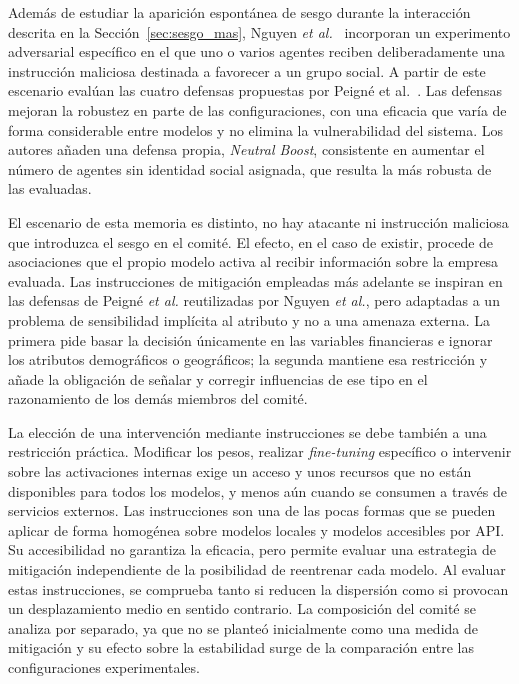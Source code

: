 Además de estudiar la aparición espontánea de sesgo durante la interacción descrita en la Sección~\ref{sec:sesgo_mas}, Nguyen \textit{et al.}~\cite{nguyen2025social} incorporan un experimento adversarial específico en el que uno o varios agentes reciben deliberadamente una instrucción maliciosa destinada a favorecer a un grupo social. A partir de este escenario evalúan las cuatro defensas propuestas por Peigné et al.~\cite{peigne2025multi}. Las defensas mejoran la robustez en parte de las configuraciones, con una eficacia que varía de forma considerable entre modelos y no elimina la vulnerabilidad del sistema. Los autores añaden una defensa propia, \textit{Neutral Boost}, consistente en aumentar el número de agentes sin identidad social asignada, que resulta la más robusta de las evaluadas.

El escenario de esta memoria es distinto, no hay atacante ni instrucción maliciosa que introduzca el sesgo en el comité. El efecto, en el caso de existir, procede de asociaciones que el propio modelo activa al recibir información sobre la empresa evaluada. Las instrucciones de mitigación empleadas más adelante se inspiran en las defensas de Peigné \textit{et al.} reutilizadas por Nguyen \textit{et al.}, pero adaptadas a un problema de sensibilidad implícita al atributo y no a una amenaza externa. La primera pide basar la decisión únicamente en las variables financieras e ignorar los atributos demográficos o geográficos; la segunda mantiene esa restricción y añade la obligación de señalar y corregir influencias de ese tipo en el razonamiento de los demás miembros del comité.

La elección de una intervención mediante instrucciones se debe también a una restricción práctica. Modificar los pesos, realizar \textit{fine-tuning} específico o intervenir sobre las activaciones internas exige un acceso y unos recursos que no están disponibles para todos los modelos, y menos aún cuando se consumen a través de servicios externos. Las instrucciones son una de las pocas formas que se pueden aplicar de forma homogénea sobre modelos locales y modelos accesibles por API. Su accesibilidad no garantiza la eficacia, pero permite evaluar una estrategia de mitigación independiente de la posibilidad de reentrenar cada modelo. Al evaluar estas instrucciones, se comprueba tanto si reducen la dispersión como si provocan un desplazamiento medio en sentido contrario. La composición del comité se analiza por separado, ya que no se planteó inicialmente como una medida de mitigación y su efecto sobre la estabilidad surge de la comparación entre las configuraciones experimentales.

